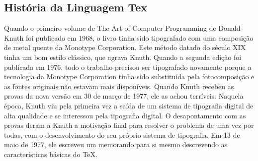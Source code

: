 

\begin{anexosenv}

\chapter{História da Linguagem Tex}\label{AxeExe}
\thispagestyle{empty}

Quando o primeiro volume de The Art of Computer Programming de Donald Knuth foi publicado em 1968, o livro tinha sido tipografado com uma composição de metal quente da Monotype Corporation. Este método datado do século XIX tinha um bom estilo clássico, que agrava Knuth. Quando a segunda edição foi publicada em 1976, todo o trabalho precisou ser tipografado novamente porque a tecnologia da Monotype Corporation tinha sido substituída pela fotocomposição e as fontes originais não estavam mais disponíveis. Quando Knuth recebeu as provas da nova versão em 30 de março de 1977, ele as achou terríveis. Naquela época, Knuth viu pela primeira vez a saída de um sistema de tipografia digital de alta qualidade e se interessou pela tipografia digital. O desapontamento com as provas deram a Knuth a motivação final para resolver o problema de uma vez por todas, com o desenvolvimento do seu próprio sistema de tipografia. Em 13 de maio de 1977, ele escreveu um memorando para si mesmo descrevendo as características básicas do TeX.



\end{anexosenv}